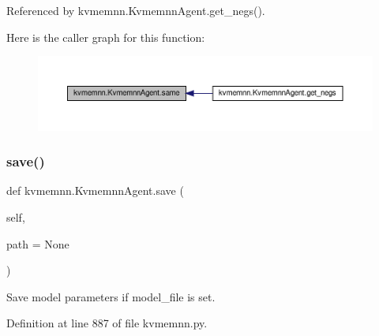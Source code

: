 Referenced by kvmemnn.\+Kvmemnn\+Agent.\+get\+\_\+negs().

Here is the caller graph for this function\+:
\nopagebreak
\begin{figure}[H]
\begin{center}
\leavevmode
\includegraphics[width=350pt]{classkvmemnn_1_1KvmemnnAgent_a59c6078593c61e0adeda8487def4706e_icgraph}
\end{center}
\end{figure}
\mbox{\label{classkvmemnn_1_1KvmemnnAgent_ad60947cc72e11489972472edbb1721fe}} 
\subsubsection{\texorpdfstring{save()}{save()}}
{\footnotesize\ttfamily def kvmemnn.\+Kvmemnn\+Agent.\+save (\begin{DoxyParamCaption}\item[{}]{self,  }\item[{}]{path = {\ttfamily None} }\end{DoxyParamCaption})}

\begin{DoxyVerb}Save model parameters if model_file is set.\end{DoxyVerb}
 

Definition at line 887 of file kvmemnn.\+py.



